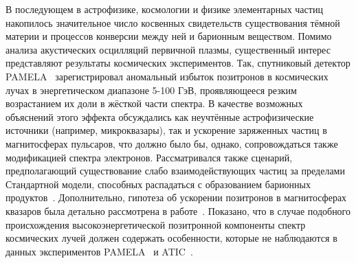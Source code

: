 В последующем в астрофизике, космологии и физике элементарных частиц
накопилось значительное число косвенных свидетельств существования
тёмной материи и процессов конверсии между ней и барионным веществом.
Помимо анализа акустических осцилляций первичной плазмы, существенный
интерес представляют результаты космических экспериментов.
Так, спутниковый детектор PAMELA~\cite{PAMELA.Adriani2009}
зарегистрировал аномальный избыток позитронов
в космических лучах в энергетическом диапазоне 5-100 ГэВ, проявляющееся
резким возрастанием их доли в жёсткой части спектра. В качестве
возможных объяснений этого эффекта обсуждались как неучтённые
астрофизические источники (например, микроквазары), так и
ускорение заряженных частиц в магнитосферах пульсаров, что должно
было бы, однако, сопровождаться также модификацией спектра электронов.
Рассматривался также сценарий, предполагающий существование слабо
взаимодействующих частиц за пределами Стандартной модели, способных
распадаться с образованием барионных продуктов~\cite{PAMELA.Adriani2009}.
Дополнительно, гипотеза об ускорении позитронов в магнитосферах квазаров
была детально рассмотрена в работе~\cite{malyshev.vs.review}. Показано, что
в случае подобного происхождения высокоэнергетической позитронной
компоненты спектр космических лучей должен содержать особенности,
которые не наблюдаются в данных экспериментов PAMELA~\cite{PAMELA.Adriani2009}
и ATIC~\cite{malyshev.vs.review}.

